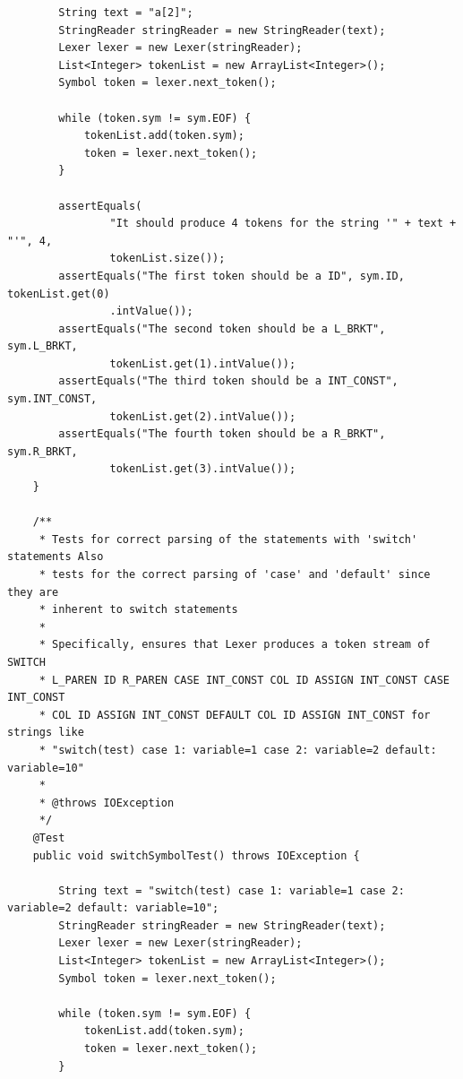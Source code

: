 \documentclass{report}
\begin{document}
\begin{verbatim}
		String text = "a[2]";
		StringReader stringReader = new StringReader(text);
		Lexer lexer = new Lexer(stringReader);
		List<Integer> tokenList = new ArrayList<Integer>();
		Symbol token = lexer.next_token();

		while (token.sym != sym.EOF) {
			tokenList.add(token.sym);
			token = lexer.next_token();
		}

		assertEquals(
				"It should produce 4 tokens for the string '" + text + "'", 4,
				tokenList.size());
		assertEquals("The first token should be a ID", sym.ID, tokenList.get(0)
				.intValue());
		assertEquals("The second token should be a L_BRKT", sym.L_BRKT,
				tokenList.get(1).intValue());
		assertEquals("The third token should be a INT_CONST", sym.INT_CONST,
				tokenList.get(2).intValue());
		assertEquals("The fourth token should be a R_BRKT", sym.R_BRKT,
				tokenList.get(3).intValue());
	}

	/**
	 * Tests for correct parsing of the statements with 'switch' statements Also
	 * tests for the correct parsing of 'case' and 'default' since they are
	 * inherent to switch statements
	 * 
	 * Specifically, ensures that Lexer produces a token stream of SWITCH
	 * L_PAREN ID R_PAREN CASE INT_CONST COL ID ASSIGN INT_CONST CASE INT_CONST
	 * COL ID ASSIGN INT_CONST DEFAULT COL ID ASSIGN INT_CONST for strings like
	 * "switch(test) case 1: variable=1 case 2: variable=2 default: variable=10"
	 * 
	 * @throws IOException
	 */
	@Test
	public void switchSymbolTest() throws IOException {

		String text = "switch(test) case 1: variable=1 case 2: variable=2 default: variable=10";
		StringReader stringReader = new StringReader(text);
		Lexer lexer = new Lexer(stringReader);
		List<Integer> tokenList = new ArrayList<Integer>();
		Symbol token = lexer.next_token();

		while (token.sym != sym.EOF) {
			tokenList.add(token.sym);
			token = lexer.next_token();
		}


\end{verbatim}
\end{document}
